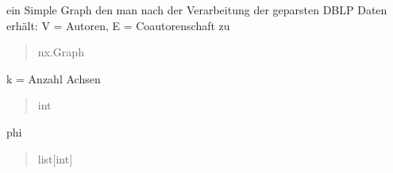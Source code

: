\documentclass[a4paper,10pt,ngerman]{sphinxmanual}
\begin{document}
\begin{fulllineitems}
\begin{fulllineitems}
\label{\detokenize{api:src.hiveplot.HivePlotLayout.graph}}
\pysigstartsignatures
\pysigline
{}
\pysigstopsignatures
\sphinxAtStartPar
ein Simple Graph den man nach der Verarbeitung der geparsten DBLP Daten erhält: V = Autoren, E = Coautorenschaft zu
\begin{quote}\begin{description}
\sphinxAtStartPar
nx.Graph

\end{description}\end{quote}

\end{fulllineitems}


\begin{fulllineitems}
\label{\detokenize{api:src.hiveplot.HivePlotLayout.num_axes}}
\pysigstartsignatures
\pysigline
{}
\pysigstopsignatures
\sphinxAtStartPar
k = Anzahl Achsen
\begin{quote}\begin{description}
\sphinxAtStartPar
int

\end{description}\end{quote}

\end{fulllineitems}


\begin{fulllineitems}
\label{\detokenize{api:src.hiveplot.HivePlotLayout.axis_order}}
\pysigstartsignatures
\pysigline
{}
\pysigstopsignatures
\sphinxAtStartPar
phi
\begin{quote}\begin{description}
\sphinxAtStartPar
list{[}int{]}

\end{description}\end{quote}

\end{fulllineitems}


\end{fulllineitems}
\end{document}
